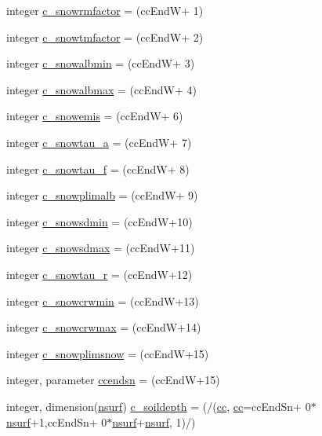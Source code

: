 \begin{DoxyCompactItemize}
\item 
integer \hyperlink{namespaceallocatearray_acfdafb59cd575be2fd9b042c4960250c}{c\+\_\+snowrmfactor} = (cc\+EndW+ 1)
\item 
integer \hyperlink{namespaceallocatearray_ab9775d921ab8069a25db5abdd6016153}{c\+\_\+snowtmfactor} = (cc\+EndW+ 2)
\item 
integer \hyperlink{namespaceallocatearray_adaf3092de4c0d3a58b29d1d1bb2120d8}{c\+\_\+snowalbmin} = (cc\+EndW+ 3)
\item 
integer \hyperlink{namespaceallocatearray_a2293a566f60b8c13fa4dfa83609d4f8a}{c\+\_\+snowalbmax} = (cc\+EndW+ 4)
\item 
integer \hyperlink{namespaceallocatearray_ae99fe2af29160de023e0a5f25ad4452e}{c\+\_\+snowemis} = (cc\+EndW+ 6)
\item 
integer \hyperlink{namespaceallocatearray_a8798dff47bfb8c70e2366c6009fa3511}{c\+\_\+snowtau\+\_\+a} = (cc\+EndW+ 7)
\item 
integer \hyperlink{namespaceallocatearray_a69df173e9777ee44bef7a9ffe6254b33}{c\+\_\+snowtau\+\_\+f} = (cc\+EndW+ 8)
\item 
integer \hyperlink{namespaceallocatearray_a29849c819c360ae6df83cd8bd1a15b69}{c\+\_\+snowplimalb} = (cc\+EndW+ 9)
\item 
integer \hyperlink{namespaceallocatearray_a9e036260613b3816f415963f40cb52ed}{c\+\_\+snowsdmin} = (cc\+EndW+10)
\item 
integer \hyperlink{namespaceallocatearray_a162466ba880bbb5e5ad214b1a9db1c47}{c\+\_\+snowsdmax} = (cc\+EndW+11)
\item 
integer \hyperlink{namespaceallocatearray_a3ca258b93aa4dd7d60ffad4b6f975f84}{c\+\_\+snowtau\+\_\+r} = (cc\+EndW+12)
\item 
integer \hyperlink{namespaceallocatearray_a8594b1be384b1a335f6908d383946f28}{c\+\_\+snowcrwmin} = (cc\+EndW+13)
\item 
integer \hyperlink{namespaceallocatearray_a401fe8a789d9f33b9a9d3d1423c789cd}{c\+\_\+snowcrwmax} = (cc\+EndW+14)
\item 
integer \hyperlink{namespaceallocatearray_a1a9bfdeb2c6ae724ce49d9bb942e84bb}{c\+\_\+snowplimsnow} = (cc\+EndW+15)
\item 
integer, parameter \hyperlink{namespaceallocatearray_a397127ec5c2e34ea6ca3aa06564180b2}{ccendsn} = (cc\+EndW+15)
\item 
integer, dimension(\hyperlink{namespaceallocatearray_acd22f92a06f7e9a2a91426b3dc99fdb0}{nsurf}) \hyperlink{namespaceallocatearray_a2cc3fd64e8be89aafe99172acbb85c29}{c\+\_\+soildepth} = (/(\hyperlink{namespaceallocatearray_ac863c81704eb507dee10f5e10741e10c}{cc}, \hyperlink{namespaceallocatearray_ac863c81704eb507dee10f5e10741e10c}{cc}=cc\+End\+Sn+ 0$\ast$\hyperlink{namespaceallocatearray_acd22f92a06f7e9a2a91426b3dc99fdb0}{nsurf}+1,cc\+End\+Sn+ 0$\ast$\hyperlink{namespaceallocatearray_acd22f92a06f7e9a2a91426b3dc99fdb0}{nsurf}+\hyperlink{namespaceallocatearray_acd22f92a06f7e9a2a91426b3dc99fdb0}{nsurf}, 1)/)

\end{DoxyCompactItemize}
